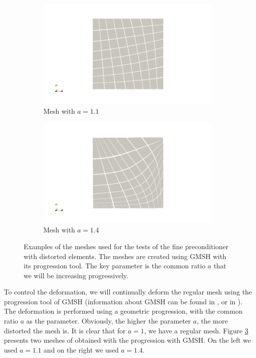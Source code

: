 \begin{figure}
\centering
\begin{subfigure}{.5\textwidth}
  \centering
  \includegraphics[width=1.2\linewidth]{Results/fine_mesh_deform_1.png}
  \caption{Mesh with $a=1.1$}
  \label{fine_mesh_deform_1}
\end{subfigure}%
\begin{subfigure}{.5\textwidth}
  \centering
  \includegraphics[width=1.2\linewidth]{Results/fine_mesh_deform_2.png}
  \caption{Mesh with $a=1.4$}
  \label{fine_mesh_deform_2}
\end{subfigure}
\caption{Examples of the meshes used for the tests of the fine preconditioner with distorted elements. The meshes are created using GMSH with its progression tool. The key parameter is the common ratio $a$ that we will be increasing progressively.}
\label{fine_mesh_deform}
\end{figure}

To control the deformation, we will continually deform the regular mesh using the progression tool of GMSH (information about GMSH can be found in \cite{gmsh}, or in \cite{gmshPaper}). The deformation is performed using a geometric progression, with the common ratio $a$ as the parameter. Obviously, the higher the parameter $a$, the more distorted the mesh is. It is clear that for $a=1$, we have a regular mesh. Figure \ref{fine_mesh_deform} presents two meshes of obtained with the progression with GMSH. On the left we used $a = 1.1$ and on the right we used $a=1.4$. 


